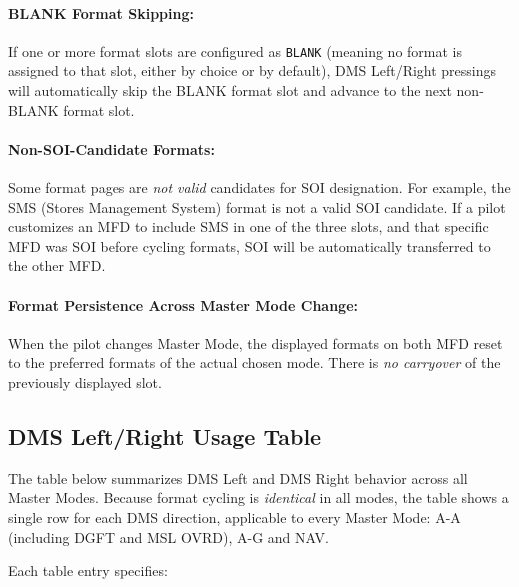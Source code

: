 \documentclass[11pt, a4paper, twoside]{report}
\begin{document}
\paragraph{BLANK Format Skipping:}

If one or more format slots are configured as \texttt{BLANK} (meaning no format is assigned to that slot, either by choice or by default), DMS Left/Right pressings will automatically skip the BLANK format slot and advance to the next non-BLANK format slot.

\paragraph{Non-SOI-Candidate Formats:}

Some format pages are \textit{not valid} candidates for SOI designation. For example, the SMS (Stores Management System) format is not a valid SOI candidate. If a pilot customizes an MFD to include SMS in one of the three slots, and that specific MFD was SOI before cycling formats, SOI will be automatically transferred to the other MFD.

\paragraph{Format Persistence Across Master Mode Change:}

When the pilot changes Master Mode, the displayed formats on both MFD reset to the preferred formats of the actual chosen mode. There is \textit{no carryover} of the previously displayed slot.


\subsection{DMS Left/Right Usage Table}
\label{sec:C3-S4-S3}

The table below summarizes DMS Left and DMS Right behavior across all Master Modes. Because format cycling is \textit{identical} in all modes, the table shows a single row for each DMS direction, applicable to every Master Mode: A-A (including DGFT and MSL OVRD), A-G and NAV.

Each table entry specifies:
\end{document}
